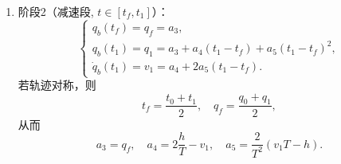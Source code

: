 \documentclass[../main.tex]{subfiles}
\begin{document}
\begin{enumerate}
\begin{enumerate}
{\begin{itemize}
\begin{enumerate}
                    \item 阶段2（减速段, $t\in[t_f,t_1]$）：
                    \[
                    \begin{cases}
                    q_b(t_f)=q_f=a_3,\\
                    q_b(t_1)=q_1=a_3+a_4(t_1-t_f)+a_5(t_1-t_f)^2,\\
                    \dot q_b(t_1)=v_1=a_4+2a_5(t_1-t_f).
                    \end{cases}
                    \]
                    若轨迹对称，则
                    \[
                    t_f=\frac{t_0+t_1}{2},\quad q_f=\frac{q_0+q_1}{2},
                    \]
                    从而
                    \[
                    a_3=q_f,\quad a_4=2\frac{h}{T}-v_1,\quad a_5=\frac{2}{T^2}(v_1T-h).
                    \]


\end{enumerate}
\end{itemize}}
\end{enumerate}
\end{enumerate}
\end{document}

